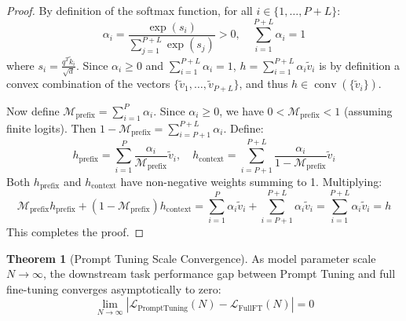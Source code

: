 \documentclass[11pt,a4paper]{article}
\theoremstyle{definition}
\newtheorem{theorem}{\textbf{Theorem}}[section]
\begin{document}
\begin{proof}
By definition of the softmax function, for all $i \in \{1, \dots, P+L\}$:
{\boldmath
\begin{equation}
\alpha_i = \frac{\exp(s_i)}{\sum_{j=1}^{P+L} \exp(s_j)} > 0, \quad \sum_{i=1}^{P+L} \alpha_i = 1
\end{equation}
}
where $s_i = \frac{q^T \tilde{k}_i}{\sqrt{d}}$.
Since $\alpha_i \ge 0$ and $\sum_{i=1}^{P+L} \alpha_i = 1$, $h = \sum_{i=1}^{P+L} \alpha_i \tilde{v}_i$ is by definition a convex combination of the vectors $\{\tilde{v}_1, \dots, \tilde{v}_{P+L}\}$, and thus $h \in \operatorname{conv}(\{\tilde{v}_i\})$.

Now define $\mathcal{M}_{\text{prefix}} = \sum_{i=1}^P \alpha_i$. Since $\alpha_i \ge 0$, we have $0 < \mathcal{M}_{\text{prefix}} < 1$ (assuming finite logits).
Then $1 - \mathcal{M}_{\text{prefix}} = \sum_{i=P+1}^{P+L} \alpha_i$.
Define:
{\boldmath
\begin{equation}
h_{\text{prefix}} = \sum_{i=1}^P \frac{\alpha_i}{\mathcal{M}_{\text{prefix}}} \tilde{v}_i, \quad h_{\text{context}} = \sum_{i=P+1}^{P+L} \frac{\alpha_i}{1 - \mathcal{M}_{\text{prefix}}} \tilde{v}_i
\end{equation}
}
Both $h_{\text{prefix}}$ and $h_{\text{context}}$ have non-negative weights summing to 1.
Multiplying:
{\boldmath
\begin{equation}
\mathcal{M}_{\text{prefix}} h_{\text{prefix}} + (1 - \mathcal{M}_{\text{prefix}}) h_{\text{context}} = \sum_{i=1}^P \alpha_i \tilde{v}_i + \sum_{i=P+1}^{P+L} \alpha_i \tilde{v}_i = \sum_{i=1}^{P+L} \alpha_i \tilde{v}_i = h
\end{equation}
}
This completes the proof.
\end{proof}

\begin{theorem}[Prompt Tuning Scale Convergence]
As model parameter scale $N \to \infty$, the downstream task performance gap between Prompt Tuning and full fine-tuning converges asymptotically to zero:
{\boldmath
\begin{equation}
\lim_{N \to \infty} |\mathcal{L}_{\text{PromptTuning}}(N) - \mathcal{L}_{\text{FullFT}}(N)| = 0
\end{equation}
}
\end{theorem}
\end{document}
